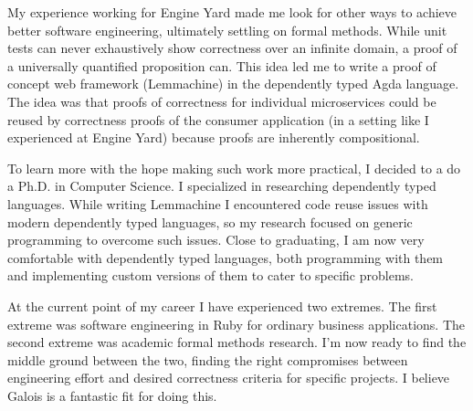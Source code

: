 \documentclass[11pt, a4paper]{awesome-cv}
\begin{document}
\begin{cvletter}
My experience working for Engine Yard made me look for other ways to
achieve better software engineering, ultimately settling on formal
methods. While unit tests can never exhaustively show correctness over
an infinite domain, a proof of a universally quantified proposition
can. This idea led me to write a proof of concept web framework
(Lemmachine) in the dependently typed Agda language. The idea was that
proofs of correctness for individual microservices could be reused by
correctness proofs of the consumer application (in a setting like I
experienced at Engine Yard) because proofs are inherently
compositional.

To learn more with the hope making such work more practical, I decided
to a do a Ph.D. in Computer Science. I specialized in researching
dependently typed languages. While writing Lemmachine I encountered
code reuse issues with modern dependently typed languages, so my
research focused on generic programming to overcome such issues. Close
to graduating, I am now very comfortable with dependently typed
languages, both programming with them and implementing custom versions
of them to cater to specific problems.


At the current point of my career I have experienced two extremes. The
first extreme was software engineering in Ruby for ordinary business
applications. The second extreme was academic formal methods
research. I'm now ready to find the middle ground between the two,
finding the right compromises between engineering effort and desired
correctness criteria for specific projects. I believe Galois is a fantastic
fit for doing this.

\end{cvletter}


\makeletterclosing
\end{document}
